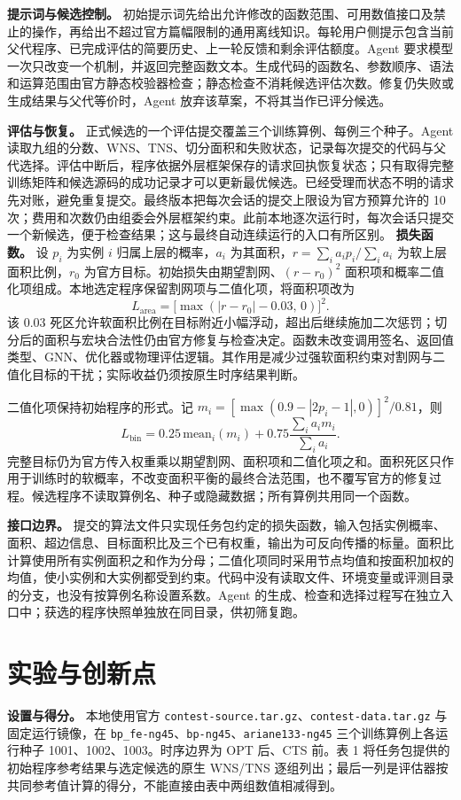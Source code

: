 \documentclass[UTF8,a4paper,11pt]{ctexart}
\begin{document}
\textbf{提示词与候选控制。} 初始提示词先给出允许修改的函数范围、可用数值接口及禁止的操作，再给出不超过官方篇幅限制的通用离线知识。每轮用户侧提示包含当前父代程序、已完成评估的简要历史、上一轮反馈和剩余评估额度。Agent 要求模型一次只改变一个机制，并返回完整函数文本。生成代码的函数名、参数顺序、语法和运算范围由官方静态校验器检查；静态检查不消耗候选评估次数。修复仍失败或生成结果与父代等价时，Agent 放弃该草案，不将其当作已评分候选。

\textbf{评估与恢复。} 正式候选的一个评估提交覆盖三个训练算例、每例三个种子。Agent 读取九组的分数、WNS、TNS、切分面积和失败状态，记录每次提交的代码与父代选择。评估中断后，程序依据外层框架保存的请求回执恢复状态；只有取得完整训练矩阵和候选源码的成功记录才可以更新最优候选。已经受理而状态不明的请求先对账，避免重复提交。最终版本把每次会话的提交上限设为官方预算允许的 10 次；费用和次数仍由组委会外层框架约束。此前本地逐次运行时，每次会话只提交一个新候选，便于检查结果；这与最终自动连续运行的入口有所区别。
\textbf{损失函数。} 设 $p_i$ 为实例 $i$ 归属上层的概率，$a_i$ 为其面积，$r=\sum_i a_i p_i/\sum_i a_i$ 为软上层面积比例，$r_0$ 为官方目标。初始损失由期望割网、$(r-r_0)^2$ 面积项和概率二值化项组成。本地选定程序保留割网项与二值化项，将面积项改为
\[
L_{\mathrm{area}}=\bigl[\max(|r-r_0|-0.03,\,0)\bigr]^2 .
\]
该 0.03 死区允许软面积比例在目标附近小幅浮动，超出后继续施加二次惩罚；切分后的面积与宏块合法性仍由官方修复与检查决定。函数未改变调用签名、返回值类型、GNN、优化器或物理评估逻辑。其作用是减少过强软面积约束对割网与二值化目标的干扰；实际收益仍须按原生时序结果判断。


二值化项保持初始程序的形式。记 $m_i=[\max(0.9-|2p_i-1|,0)]^2/0.81$，则
\[
L_{\mathrm{bin}}=0.25\,\mathrm{mean}_i(m_i)
+0.75\frac{\sum_i a_i m_i}{\sum_i a_i}.
\]
完整目标仍为官方传入权重乘以期望割网、面积项和二值化项之和。面积死区只作用于训练时的软概率，不改变面积平衡的最终合法范围，也不覆写官方的修复过程。候选程序不读取算例名、种子或隐藏数据；所有算例共用同一个函数。

\textbf{接口边界。} 提交的算法文件只实现任务包约定的损失函数，输入包括实例概率、面积、超边信息、目标面积比及三个已有权重，输出为可反向传播的标量。面积比计算使用所有实例面积之和作为分母；二值化项同时采用节点均值和按面积加权的均值，使小实例和大实例都受到约束。代码中没有读取文件、环境变量或评测目录的分支，也没有按算例名称设置系数。Agent 的生成、检查和选择过程写在独立入口中；获选的程序快照单独放在同目录，供初筛复跑。
\section{实验与创新点}
\textbf{设置与得分。} 本地使用官方 \texttt{contest-source.tar.gz}、\texttt{contest-data.tar.gz} 与固定运行镜像，在 \texttt{bp\_fe-ng45}、\texttt{bp-ng45}、\texttt{ariane133-ng45} 三个训练算例上各运行种子 1001、1002、1003。时序边界为 OPT 后、CTS 前。表 1 将任务包提供的初始程序参考结果与选定候选的原生 WNS/TNS 逐组列出；最后一列是评估器按共同参考值计算的得分，不能直接由表中两组数值相减得到。
\end{document}
